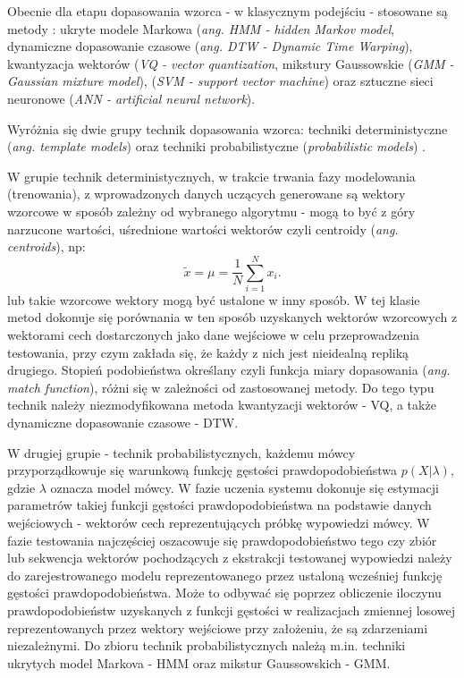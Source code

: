 Obecnie dla etapu dopasowania wzorca - w klasycznym podejściu - stosowane są metody \cite{campbell} \cite{overview}: ukryte modele Markowa (\textit{ang. HMM - hidden Markov model}, dynamiczne dopasowanie czasowe (\textit{ang. DTW - Dynamic Time Warping}), kwantyzacja wektorów (\textit{VQ - vector quantization}, mikstury Gaussowskie (\textit{GMM - Gaussian mixture model}), (\textit{SVM - support vector machine}) oraz sztuczne sieci neuronowe (\textit{ANN - artificial neural network}).

Wyróżnia się dwie grupy technik dopasowania wzorca: techniki deterministyczne (\textit{ang. template models}) oraz techniki probabilistyczne (\textit{probabilistic models}) \cite{campbell}.

W grupie technik deterministycznych, w trakcie trwania fazy modelowania (trenowania), z wprowadzonych danych uczących generowane są wektory wzorcowe w sposób zależny od wybranego algorytmu - mogą to być z góry narzucone wartości, uśrednione wartości wektorów  czyli centroidy (\textit{ang. centroids}), np:
\begin{equation}
  \tilde{x} = \mu = \frac{1}{N}\sum_{i=1}^{N}x_i.
  \label{centroid}
\end{equation}
lub takie wzorcowe wektory mogą być ustalone w inny sposób. W tej klasie metod dokonuje się porównania w ten sposób uzyskanych wektorów wzorcowych z wektorami cech dostarczonych jako dane wejściowe w celu przeprowadzenia testowania, przy czym zakłada się, że \cite{overview} \cite{campbell} każdy z nich jest nieidealną repliką drugiego. Stopień podobieństwa określany czyli funkcja miary dopasowania (\textit{ang. match function}), różni się w zależności od zastosowanej metody. Do tego typu technik należy niezmodyfikowana metoda kwantyzacji wektorów - VQ, a także dynamiczne dopasowanie czasowe - DTW.

W drugiej grupie - technik probabilistycznych, każdemu mówcy przyporządkowuje się warunkową funkcję gęstości prawdopodobieństwa $ p(X|\lambda)$, gdzie $\lambda$ oznacza model mówcy. W fazie uczenia systemu dokonuje się estymacji parametrów takiej funkcji gęstości prawdopodobieństwa na podstawie danych wejściowych - wektorów cech reprezentujących próbkę wypowiedzi mówcy. W fazie testowania najczęściej oszacowuje się prawdopodobieństwo tego czy zbiór lub sekwencja wektorów pochodzących z ekstrakcji testowanej wypowiedzi należy do zarejestrowanego modelu reprezentowanego przez ustaloną wcześniej funkcję gęstości prawdopodobieństwa. Może to odbywać się poprzez obliczenie iloczynu prawdopodobieństw uzyskanych z funkcji gęstości w realizacjach zmiennej losowej reprezentowanych przez wektory wejściowe przy założeniu, że są zdarzeniami niezależnymi. 
Do zbioru technik probabilistycznych należą m.in. techniki ukrytych model Markova - HMM oraz mikstur Gaussowskich - GMM.

